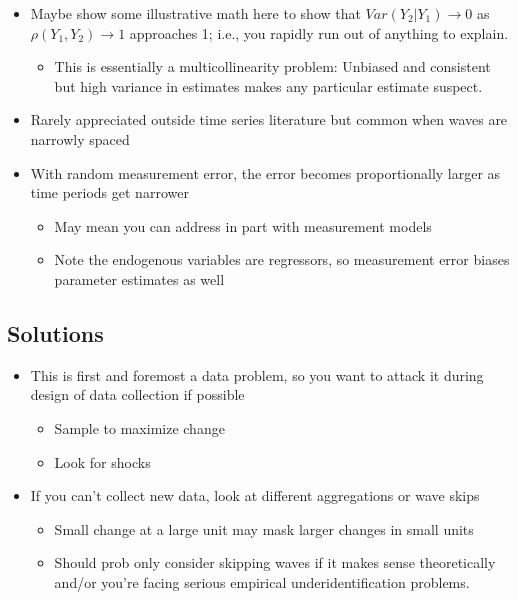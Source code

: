 \documentclass[
  letterpaper,
  DIV=11,
  numbers=noendperiod]{scrartcl}
\providecommand{\tightlist}{%
  \setlength{\itemsep}{0pt}\setlength{\parskip}{0pt}}\usepackage{longtable,booktabs,array}
\begin{document}
\begin{itemize}
\tightlist
\item
  Maybe show some illustrative math here to show that
  \(Var(Y_2|Y_1) \rightarrow 0\) as \(\rho(Y_1,Y_2) \rightarrow 1\)
  approaches 1; i.e., you rapidly run out of anything to explain.

  \begin{itemize}
  \tightlist
  \item
    This is essentially a multicollinearity problem: Unbiased and
    consistent but high variance in estimates makes any particular
    estimate suspect.
  \end{itemize}
\item
  Rarely appreciated outside time series literature but common when
  waves are narrowly spaced
\item
  With random measurement error, the error becomes proportionally larger
  as time periods get narrower

  \begin{itemize}
  \tightlist
  \item
    May mean you can address in part with measurement models
  \item
    Note the endogenous variables are regressors, so measurement error
    biases parameter estimates as well
  \end{itemize}
\end{itemize}

\subsection{Solutions}\label{solutions-2}

\begin{itemize}
\tightlist
\item
  This is first and foremost a data problem, so you want to attack it
  during design of data collection if possible

  \begin{itemize}
  \tightlist
  \item
    Sample to maximize change
  \item
    Look for shocks
  \end{itemize}
\item
  If you can't collect new data, look at different aggregations or wave
  skips

  \begin{itemize}
  \tightlist
  \item
    Small change at a large unit may mask larger changes in small units
  \item
    Should prob only consider skipping waves if it makes sense
    theoretically and/or you're facing serious empirical
    underidentification problems.
  \end{itemize}
\end{itemize}
\end{document}
